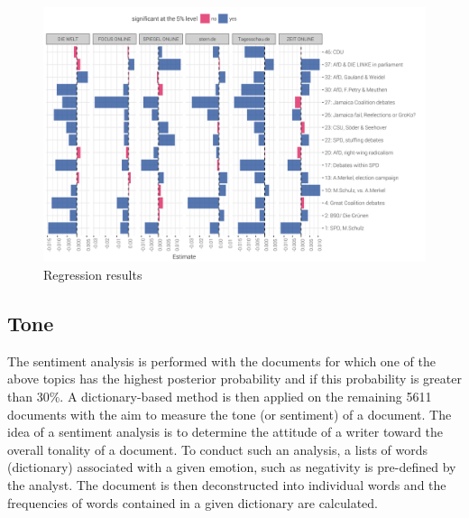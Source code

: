 \documentclass[12pt,a4paper,notitlepage]{article}
\begin{document}
\begin{figure}[H]
	\caption{Regression results}
		\begin{center}
			\includegraphics[width=\textwidth,keepaspectratio]{../figs/estimates.png}
		\end{center}
	\label{fig_estimateEffects}
\end{figure}

\subsection{Tone}\label{subsection_tone}

The sentiment analysis is performed with the documents for which one of the above topics has the highest posterior probability and if this probability is greater than 30\%. A dictionary-based method is then applied on the remaining 5611 documents with the aim to measure the tone (or sentiment) of a document. The idea of a sentiment analysis is to determine the attitude of a writer toward the overall tonality of a document. To conduct such an analysis, a lists of words (dictionary) associated with a given emotion, such as negativity is pre-defined by the analyst. The document is then deconstructed into individual words and the frequencies of words contained in a given dictionary are calculated. 
\end{document}
